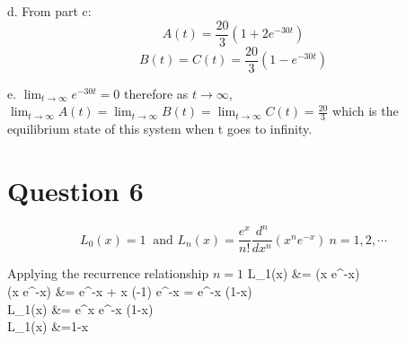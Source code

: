 \documentclass[12pt,twoside]{article}
\begin{document}
\item [d.]
From part c:
\[
	A(t) = \frac{20}{3} (1 + 2 e^{-30t})
\]
\[
	B(t) = C(t) =  \frac{20}{3} (1 - e^{-30t})
\]

\item [e.]
$\lim_{t \rightarrow \infty} e^{-30t} = 0$ therefore as $t \rightarrow \infty$, $\lim_{t \rightarrow \infty}  A(t) = \lim_{t \rightarrow \infty}  B(t)  = \lim_{t \rightarrow \infty}  C(t) = \frac{20}{3}$ which is the equilibrium state of this system
when t goes to infinity.

\ee

\section*{Question 6}
\[
	L_0(x) = 1 ~ \text{ and } L_n(x) = \frac{e^x}{n!} \frac{d^n}{dx^n}(x^n e^{-x}) ~ n = 1,2,\cdots
\]

Applying the recurrence relationship
\newpage
$n=1$
\ba
	L_1(x) 				&=    (x e^{-x}) \\
	  (x e^{-x})	&= e^{-x} + x (-1)  e^{-x}  =  e^{-x} (1-x) \\
	L_1(x) 				&= e^x e^{-x} (1-x)  \\	 
	L_1(x) 				&=1-x \\	 
\ea
\end{document}
